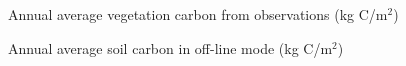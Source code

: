 \documentclass[10pt,a4paper]{report}
\begin{document}
\begin{figure}
\centerline{}
\caption{Annual average vegetation carbon from observations (kg
C/m$^{2}$)}\label{vegobs}
\end{figure}

\begin{figure}
\centerline{}
\caption{Annual average soil carbon in off-line mode (kg
C/m$^{2}$)}\label{soilcarbontun}
\end{figure}
\end{document}
